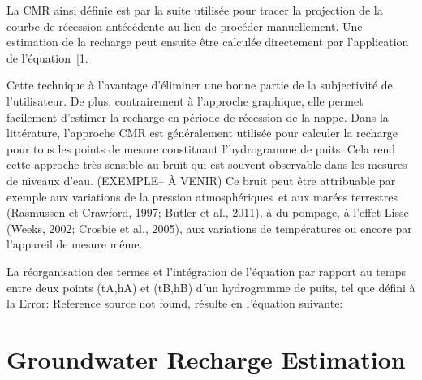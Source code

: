 \documentclass[WHATMANUAL.tex]{subfiles}
\begin{document}
La CMR ainsi définie est par la suite utilisée pour tracer la projection de la courbe de récession antécédente au lieu de procéder manuellement. Une estimation de la recharge peut ensuite être calculée directement par l'application de l'équation [1.

Cette technique à l'avantage d'éliminer une bonne partie de la subjectivité de l'utilisateur. De plus, contrairement à l'approche graphique, elle permet facilement d'estimer la recharge en période de récession de la nappe. Dans la littérature, l'approche CMR est généralement utilisée pour calculer la recharge pour tous les points de mesure constituant l'hydrogramme de puits. Cela rend cette approche très sensible au bruit qui est souvent observable dans les mesures de niveaux d'eau. (EXEMPLE– À VENIR) Ce bruit peut être attribuable par exemple aux variations de la pression atmosphériques et aux marées terrestres (Rasmussen et Crawford, 1997; Butler et al., 2011), à du pompage, à l'effet Lisse (Weeks, 2002; Crosbie et al., 2005), aux variations de températures ou encore par l'appareil de mesure même.

La réorganisation des termes et l’intégration de l’équation
 par rapport au temps entre deux points (tA,hA) et (tB,hB) d'un hydrogramme de puits, tel que défini à la Error: Reference source not found, résulte en l’équation suivante:
 
\section{Groundwater Recharge Estimation}
\end{document}
